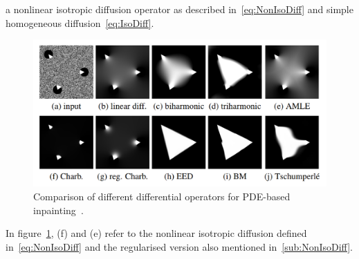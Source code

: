 a nonlinear isotropic diffusion operator as described in~\eqref{eq:NonIsoDiff} and simple
homogeneous diffusion~\eqref{eq:IsoDiff}.
\begin{figure}[h]
    \centering
    \includegraphics[width=\linewidth]{../Images/diffops_compare.png}
    \caption{Comparison of different differential operators for PDE-based
    inpainting~\cite{schmaltz14}.}\label{fig:DiffOpsCompare}
\end{figure}
In figure~\ref{fig:DiffOpsCompare}, (f) and (e) refer to the nonlinear isotropic diffusion defined
in~\eqref{eq:NonIsoDiff} and the regularised version also mentioned in~\ref{sub:NonIsoDiff}.
